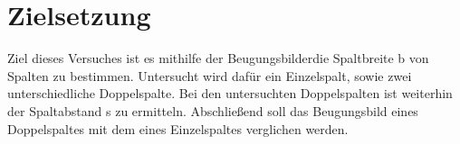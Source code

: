 \section{Zielsetzung}
\label{sec:Zielsetzung}

Ziel dieses Versuches ist es mithilfe der Beugungsbilderdie Spaltbreite b von Spalten zu bestimmen.
Untersucht wird dafür ein Einzelspalt, sowie zwei unterschiedliche Doppelspalte.
Bei den untersuchten Doppelspalten ist weiterhin der Spaltabstand s zu ermitteln.
Abschließend soll das Beugungsbild eines Doppelspaltes mit dem eines Einzelspaltes verglichen werden.
